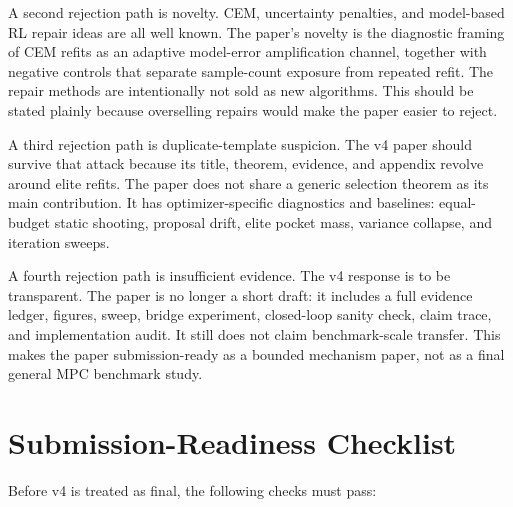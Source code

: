 A second rejection path is novelty. CEM, uncertainty penalties, and
model-based RL repair ideas are all well known. The paper's novelty is the
diagnostic framing of CEM refits as an adaptive model-error amplification
channel, together with negative controls that separate sample-count exposure
from repeated refit. The repair methods are intentionally not sold as new
algorithms. This should be stated plainly because overselling repairs would
make the paper easier to reject.

A third rejection path is duplicate-template suspicion. The v4 paper should
survive that attack because its title, theorem, evidence, and appendix revolve
around \cem{} elite refits. The paper does not share a generic selection
theorem as its main contribution. It has optimizer-specific diagnostics and
baselines: equal-budget static shooting, proposal drift, elite pocket mass,
variance collapse, and iteration sweeps.

A fourth rejection path is insufficient evidence. The v4 response is to be
transparent. The paper is no longer a short draft: it includes a full evidence
ledger, figures, sweep, bridge experiment, closed-loop sanity check, claim
trace, and implementation audit. It still does not claim benchmark-scale
transfer. This makes the paper submission-ready as a bounded mechanism paper,
not as a final general MPC benchmark study.

\section{Submission-Readiness Checklist}
\label{app:submission-checklist}

Before v4 is treated as final, the following checks must pass:

